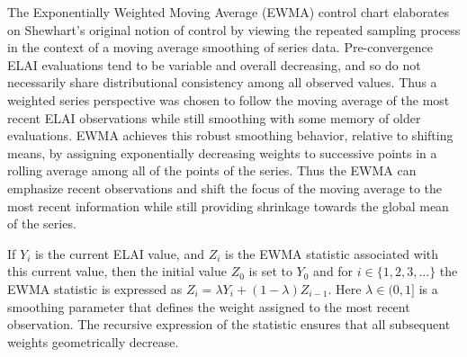 \documentclass{article}
\begin{document}
%
The Exponentially Weighted Moving Average (EWMA) control chart 
\citep{ewmaPaper, qccPack} elaborates on Shewhart's original notion of control 
by viewing the repeated sampling process in the context of a moving average 
smoothing of series data. Pre-convergence ELAI evaluations tend to be variable 
and overall decreasing, and so do not necessarily share distributional 
consistency among all observed values. 
Thus a weighted series perspective was chosen to follow the moving average of 
the most recent ELAI observations while still smoothing with some memory of 
older evaluations. EWMA achieves this robust smoothing behavior, relative to 
shifting means, by assigning exponentially decreasing weights to successive 
points in a rolling average among all of the points of the series. Thus the 
EWMA can emphasize recent observations and shift the focus of the moving 
average to the most recent information while still providing shrinkage towards 
the global mean of the series.

%
%

%
If $Y_i$ is the current ELAI value, and $Z_i$ is the EWMA statistic associated 
with this current value, then the initial value $Z_0$ is set to $Y_0$ and for 
$i\in\{1, 2, 3, ...\}$ the EWMA statistic is expressed as $Z_i=\lambda Y_i+(1-\lambda)Z_{i-1}$.
Here $\lambda \in (0,1]$ is a smoothing parameter that defines the weight 
assigned to the most recent observation. The recursive expression of the 
statistic ensures that all subsequent weights geometrically decrease.
\end{document}
